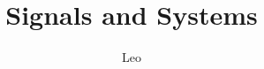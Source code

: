 \documentclass{ctexbook}
\title{Signals and Systems}
\author{Leo}
\numberwithin{equation}{chapter}
\begin{document}
\newcommand{\dif}{\mathrm{d}}
\newcommand{\noindentbf}[1]{\noindent \textbf{#1} \quad}
\newcommand{\noindentbfline}[1]{\noindent \textbf{#1} \newline}
\maketitle
\tableofcontents
%
%



\end{document}
